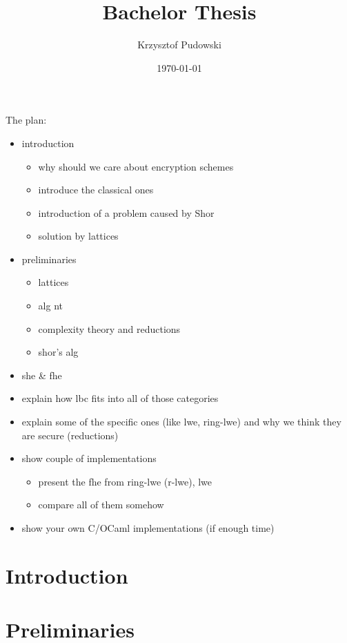 \documentclass[11pt,a4paper]{article}
\title{Bachelor Thesis}
\author{Krzysztof Pudowski}
\date{\today}
\theoremstyle{plain}
\theoremstyle{definition}
\theoremstyle{remark}
\begin{document}



\tableofcontents

The plan:
\begin{itemize}
    \item introduction
    \begin{itemize}
        \item why should we care about encryption schemes
        \item introduce the classical ones
        \item introduction of a problem caused by Shor
        \item solution by lattices
    \end{itemize}
    \item preliminaries
    \begin{itemize}
        \item lattices
        \item alg nt
        \item complexity theory and reductions
        \item shor's alg
    \end{itemize}
    \item she \& fhe
    \item explain how lbc fits into all of those categories
    \item explain some of the specific ones (like lwe, ring-lwe) and why we think they are secure (reductions)
    \item show couple of implementations
    \begin{itemize}
        \item present the fhe from ring-lwe (r-lwe), lwe
        \item compare all of them somehow
    \end{itemize}

    \item show your own C/OCaml implementations (if enough time)
\end{itemize}

\section{Introduction}


\section{Preliminaries}

\end{document}
